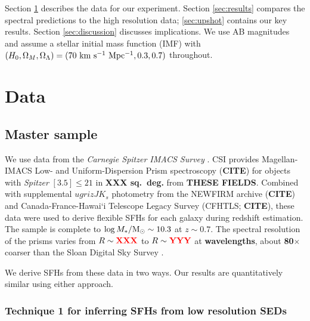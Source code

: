 \documentclass[a4paper,fleqn,usenatbib]{mnras}
\newcommand{\Msun}{{\rm M}_\odot}
\newcommand{\Mstel}{M_\ast}
\newcommand{\logM}{\log\Mstel/\Msun}
\newcommand{\bfr}{\bf\color{red}}
\newcommand{\CITE}{{\bfr CITE}}
\begin{document}
Section \ref{sec:data} describes the data for our experiment. Section \ref{sec:results} compares 
the spectral predictions to the high resolution data; \ref{sec:upshot} contains our key results. 
Section \ref{sec:discussion} discusses implications. We use AB magnitudes and assume 
a \citet{Chabrier03} stellar initial mass function (IMF) with $(H_{0}, \Omega_{M}, \Omega_{\Lambda}) =
(70~{\rm km~s^{-1}~Mpc^{-1}}, 0.3, 0.7)$ throughout.



\section{Data}
\label{sec:data}

\subsection{Master sample}
\label{sec:master}

We use data from the {\it Carnegie Spitzer IMACS Survey} \citep[CSI;][]{Kelson14a}. CSI provides
Magellan-IMACS Low- and Uniform-Dispersion Prism spectroscopy (\CITE) for objects with {\it Spitzer} 
$[3.5]\leq21$ in {\bfr XXX sq.~deg.} from {\bfr THESE FIELDS}. Combined with supplemental 
$ugrizJK_{s}$ photometry from the NEWFIRM archive (\CITE) and Canada-France-Hawai`i Telescope 
Legacy Survey (CFHTLS; \CITE), these data were used to derive flexible SFHs for each galaxy
during redshift estimation. The sample is complete to $\logM\sim10.3$ at $z\sim0.7$.
The spectral resolution of the prisms varies from $R\sim{\bfr XXX}$ to $R\sim{\bfr YYY}$ at
{\bfr wavelengths}, about {\bfr 80$\times$} coarser than the Sloan Digital Sky Survey \citep{York00}.

We derive SFHs from these data in two ways. Our results are quantitatively similar
using either approach.


\subsubsection{Technique 1 for inferring SFHs from low resolution SEDs}
\label{sec:blocks}
\end{document}
